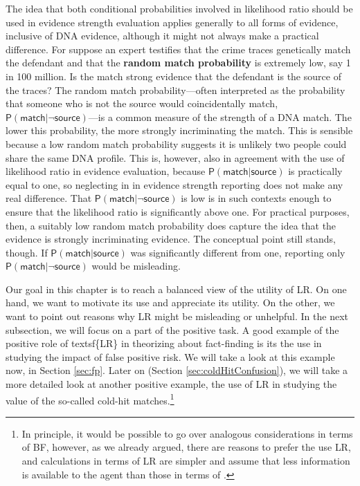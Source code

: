 \documentclass[10pt,dvipsnames,enabledeprecatedfontcommands]{scrartcl}
\newcommand{\pr}[1]{\mathsf{P}(#1)}
\begin{document}
The idea that both conditional probabilities involved in likelihood
ratio should be used in evidence strength evaluation applies generally
to all forms of evidence, inclusive of DNA evidence, although it might
not always make a practical difference. For suppose an expert testifies
that the crime traces genetically match the defendant and that the
\textbf{random match probability} is extremely low, say 1 in 100
million. Is the match strong evidence that the defendant is the source
of the traces? The random match probability---often interpreted as the
probability that someone who is not the source would coincidentally
match, \(\pr{\textsf{match} \vert \neg \textsf{source}}\)---is a common
measure of the strength of a DNA match. The lower this probability, the
more strongly incriminating the match. This is sensible because a low
random match probability suggests it is unlikely two people could share
the same DNA profile. This is, however, also in agreement with the use
of likelihood ratio in evidence evaluation, because
\(\pr{\textsf{match} \vert \textsf{source}}\) is practically equal to
one, so neglecting in in evidence strength reporting does not make any
real difference. That \(\pr{\textsf{match} \vert \neg \textsf{source}}\)
is low is in such contexts enough to ensure that the likelihood ratio is
significantly above one. For practical purposes, then, a suitably low
random match probability does capture the idea that the evidence is
strongly incriminating evidence. The conceptual point still stands,
though. If \(\pr{\textsf{match} \vert \textsf{source}}\) was
significantly different from one, reporting only
\(\pr{\textsf{match} \vert \neg \textsf{source}}\) would be misleading.

Our goal in this chapter is to reach a balanced view of the utility of
\textsf{LR}. On one hand, we want to motivate its use and appreciate its
utility. On the other, we want to point out reasons why \textsf{LR}
might be misleading or unhelpful. In the next subsection, we will focus
on a part of the positive task. A good example of the positive role of
textsf\{LR\} in theorizing about fact-finding is its the use in studying
the impact of false positive risk. We will take a look at this example
now, in Section \ref{sec:fp}. Later on (Section
\ref{sec:coldHitConfusion}), we will take a more detailed look at
another positive example, the use of \textsf{LR} in studying the value
of the so-called cold-hit matches.\footnote{In principle, it would be
  possible to go over analogous considerations in terms of \textsf{BF},
  however, as we already argued, there are reasons to prefer the use
  \textsf{LR}, and calculations in terms of \textsf{LR} are simpler and
  assume that less information is available to the agent than those in
  terms of .}
\end{document}
